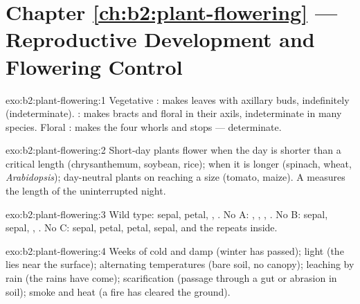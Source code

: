 \section*{Chapter \ref{ch:b2:plant-flowering} --- Reproductive Development and Flowering Control}

\begin{solution}{exo:b2:plant-flowering:1}
Vegetative : makes leaves with axillary buds, indefinitely
(indeterminate). : makes bracts and floral
 in their axils, indeterminate in many species. Floral
: makes the four whorls and stops --- determinate.
\end{solution}

\begin{solution}{exo:b2:plant-flowering:2}
Short-day plants flower when the day is shorter than a critical
length (chrysanthemum, soybean, rice);  when it is
longer (spinach, wheat, \emph{Arabidopsis}); day-neutral plants
 on reaching a size (tomato, maize). A 
measures the length of the uninterrupted night.
\end{solution}

\begin{solution}{exo:b2:plant-flowering:3}
Wild type: sepal, petal, , . No A: , ,
, . No B: sepal, sepal, , . No C: sepal,
petal, petal, sepal, and the  repeats inside.
\end{solution}

\begin{solution}{exo:b2:plant-flowering:4}
Weeks of cold and damp (winter has passed); light (the  lies
near the surface); alternating temperatures (bare soil, no canopy);
leaching by rain (the rains have come); scarification (passage
through a gut or abrasion in soil); smoke and heat (a fire has
cleared the ground).
\end{solution}

